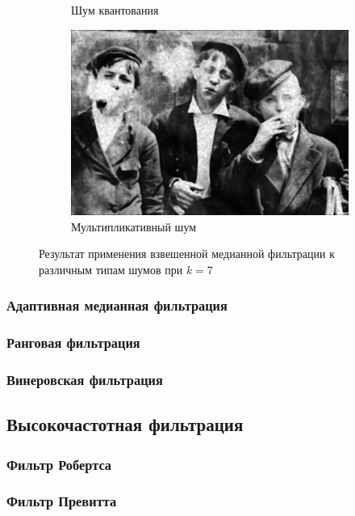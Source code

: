 \begin{figure}[ht]
\begin{subfigure}[b]{0.5\linewidth}
      \caption{Шум квантования} 
      \label{median_7:e}
    \end{subfigure}%
    \begin{subfigure}[b]{0.5\linewidth}
        \centering
        \includegraphics[width=0.95\linewidth]{../Median_2D_Filter/Median_2DSpeckle_noise_(k=7).jpg} 
        \caption{Мультипликативный шум} 
        \label{median_7:f} 
    \end{subfigure} 
    \caption{Результат применения взвешенной медианной фильтрации к различным типам шумов при $k = 7$}
    \label{img:median_7} 
\end{figure}


\subsubsection{Адаптивная медианная фильтрация}
\subsubsection{Ранговая фильтрация}
\subsubsection{Винеровская фильтрация}

\subsection{Высокочастотная фильтрация}
\subsubsection{Фильтр Робертса}
\newpage
\subsubsection{Фильтр Превитта}
